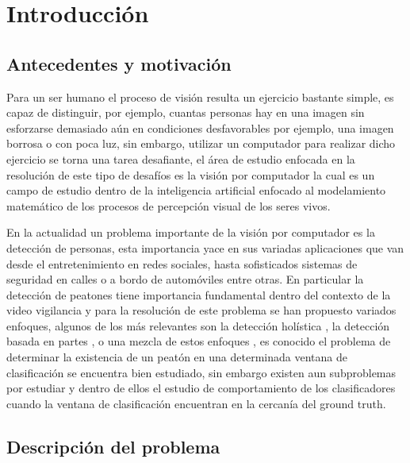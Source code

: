 \chapter{Introducci\'on}
\label{cap:intro}

\section{Antecedentes y motivaci\'on}
\label{intro:motivacion}

Para un ser humano el proceso de visión resulta un ejercicio bastante simple, es capaz de distinguir, por ejemplo, cuantas personas hay en una imagen sin esforzarse demasiado aún en condiciones desfavorables por ejemplo, una imagen borrosa o con poca luz, sin embargo, utilizar un computador para realizar dicho ejercicio se torna una tarea desafiante, el área de estudio enfocada en la resolución de este tipo de desafíos es la visión por computador la cual es un campo de estudio dentro de la inteligencia artificial enfocado al modelamiento matemático de los procesos de percepción visual de los seres vivos.

En la actualidad un problema importante de la visión por computador es la detección de personas, esta importancia yace en sus variadas aplicaciones que van desde el entretenimiento en redes sociales, hasta sofisticados sistemas de seguridad en calles o a bordo de automóviles entre otras. En particular la detección de peatones tiene importancia fundamental dentro del contexto de la video vigilancia y para la resolución de este problema se han propuesto variados enfoques, algunos de los más relevantes son la detección holística \citep{dalal2006}, la detección basada en partes \citep{nevatia2005}, o una mezcla de estos enfoques \citep{leibe2005,yu2011}, es conocido el problema de determinar la existencia de un peatón en una determinada ventana de clasificación se encuentra bien estudiado, sin embargo existen aun subproblemas por estudiar y dentro de ellos el estudio de comportamiento de los clasificadores cuando la ventana de clasificación encuentran en la cercanía del ground truth.

\section{Descripci\'on del problema}
\label{intro:problema}

